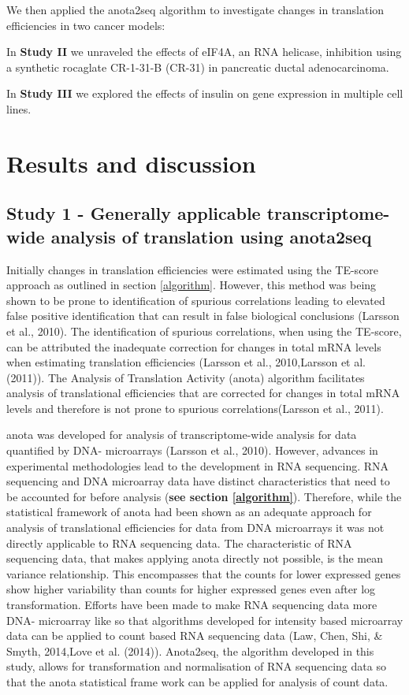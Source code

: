 \documentclass[12pt,openany]{book}
\begin{document}
We then applied the anota2seq algorithm to investigate changes in
translation efficiencies in two cancer models:

In \textbf{Study II} we unraveled the effects of eIF4A, an RNA helicase,
inhibition using a synthetic rocaglate CR-1-31-B (CR-31) in pancreatic
ductal adenocarcinoma.

In \textbf{Study III} we explored the effects of insulin on gene
expression in multiple cell lines.

\chapter{Results and discussion}

\section{Study 1 - Generally applicable transcriptome-wide analysis of translation using anota2seq}

Initially changes in translation efficiencies were estimated using the
TE-score approach as outlined in section \ref{algorithm}. However, this
method was being shown to be prone to identification of spurious
correlations leading to elevated false positive identification that can
result in false biological conclusions (Larsson et al., 2010). The
identification of spurious correlations, when using the TE-score, can be
attributed the inadequate correction for changes in total mRNA levels
when estimating translation efficiencies (Larsson et al., 2010,Larsson
et al. (2011)). The Analysis of Translation Activity (anota) algorithm
facilitates analysis of translational efficiencies that are corrected
for changes in total mRNA levels and therefore is not prone to spurious
correlations(Larsson et al., 2011).

anota was developed for analysis of transcriptome-wide analysis for data
quantified by DNA- microarrays (Larsson et al., 2010). However, advances
in experimental methodologies lead to the development in RNA sequencing.
RNA sequencing and DNA microarray data have distinct characteristics
that need to be accounted for before analysis (\textbf{see section
\ref{algorithm}}). Therefore, while the statistical framework of anota
had been shown as an adequate approach for analysis of translational
efficiencies for data from DNA microarrays it was not directly
applicable to RNA sequencing data. The characteristic of RNA sequencing
data, that makes applying anota directly not possible, is the mean
variance relationship. This encompasses that the counts for lower
expressed genes show higher variability than counts for higher expressed
genes even after log transformation. Efforts have been made to make RNA
sequencing data more DNA- microarray like so that algorithms developed
for intensity based microarray data can be applied to count based RNA
sequencing data (Law, Chen, Shi, \& Smyth, 2014,Love et al. (2014)).
Anota2seq, the algorithm developed in this study, allows for
transformation and normalisation of RNA sequencing data so that the
anota statistical frame work can be applied for analysis of count data.
\end{document}
